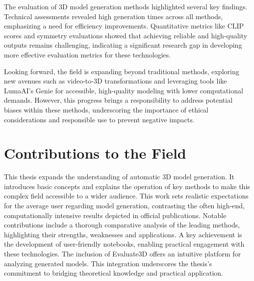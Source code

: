 The evaluation of 3D model generation methods highlighted several key findings. Technical assessments revealed high generation times across all methods, emphasizing a need for efficiency improvements. Quantitative metrics like CLIP scores and symmetry evaluations showed that achieving reliable and high-quality outputs remains challenging, indicating a significant research gap in developing more effective evaluation metrics for these technologies.

Looking forward, the field is expanding beyond traditional methods, exploring new avenues such as video-to-3D transformations and leveraging tools like LumaAI's Genie for accessible, high-quality modeling with lower computational demands. However, this progress brings a responsibility to address potential biases within these methods, underscoring the importance of ethical considerations and responsible use to prevent negative impacts.

\section{Contributions to the Field}

This thesis expands the understanding of automatic 3D model generation. It introduces basic concepts and explains the operation of key methods to make this complex field accessible to a wider audience. This work sets realistic expectations for the average user regarding model generation, contrasting the often high-end, computationally intensive results depicted in official publications. Notable contributions include a thorough comparative analysis of the leading methods, highlighting their strengths, weaknesses and applications. A key achievement is the development of user-friendly notebooks, enabling practical engagement with these technologies. The inclusion of Evaluate3D offers an intuitive platform for analyzing generated models. This integration underscores the thesis's commitment to bridging theoretical knowledge and practical application. 

